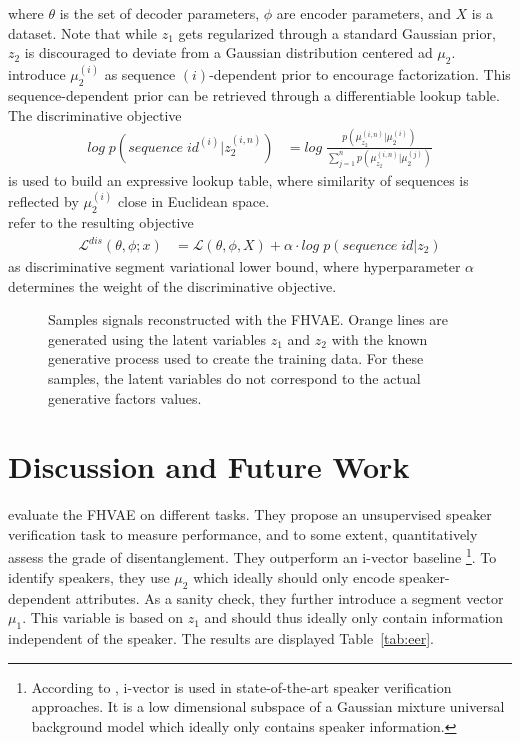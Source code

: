 \documentclass{article} %
\begin{document}
where $\theta$ is the set of decoder parameters, $\phi$ are encoder parameters, and $X$ is a dataset. Note that while $z_1$ gets regularized through a standard Gaussian prior, $z_2$ is discouraged to deviate from a Gaussian distribution centered ad $\mu_2$. \citet{hsu2017unsupervised} introduce $\mu_{2}^{(i)}$ as sequence $(i)$-dependent prior to encourage factorization. This sequence-dependent prior can be retrieved through a differentiable lookup table. The discriminative objective 
\begin{align*}
log\;p(sequence\;id^{(i)} | z_2^{(i,n)})& = log\;\frac{p(\mu_{z_2}^{(i,n)}|\mu_2^{(i)})}{\sum^{n}_{j=1}	p(\mu_{z_2}^{(i,n)}|\mu_2^{(j)})}
\end{align*}
is used to build an expressive lookup table, where similarity of sequences is reflected by $\mu_{2}^{(i)}$ close in Euclidean space.\\
\citet{hsu2017unsupervised} refer to the resulting objective
\begin{align*}
\mathcal{L}^{dis}(\theta, \phi;x)& = \mathcal{L}(\theta, \phi, X) + \alpha \cdot log\;p(sequence\;id | z_2)
\end{align*}
as discriminative segment variational lower bound, where hyperparameter $\alpha$ determines the weight of the discriminative objective.



\begin{figure}[t]\scriptsize
	\centering
	\caption{Samples signals reconstructed with the FHVAE. Orange lines are generated using the latent variables $z_1$ and $z_2$ with the known generative process used to create the training data. For these samples, the latent variables do not correspond to the actual generative factors values.}
\end{figure}



\section*{Discussion and Future Work}
\citet{hsu2017unsupervised} evaluate the FHVAE on different tasks. They propose an unsupervised speaker verification task to measure performance, and to some extent, quantitatively assess the grade of disentanglement. They outperform an i-vector baseline \footnote{According to \citet{hsu2017unsupervised}, i-vector is used in state-of-the-art speaker verification approaches. It is a low dimensional subspace of a Gaussian mixture universal background model which ideally only contains speaker information.}. To identify speakers, they use $\mu_2$ which ideally should only encode speaker-dependent attributes. As a sanity check, they further introduce a segment vector $\mu_1$. This variable is based on $z_1$ and should thus ideally only contain information independent of the speaker. The results are displayed Table~\ref{tab:eer}.
\end{document}
